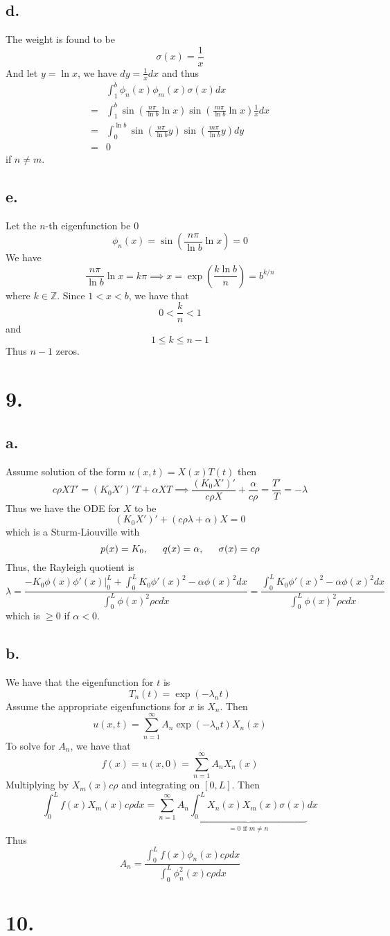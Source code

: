 \documentclass[11pt]{article}
\theoremstyle{mystyle}
\theoremstyle{definition}
\begin{document}
\subsection*{d.}
The weight is found to be 
\[
  \sigma(x) = \displaystyle\frac{1}{x}
\]
And let $y = \ln x$, we have $dy = \displaystyle\frac{1}{x} dx$ and thus  
\begin{align*}
  &\int_1^b \phi_n(x) \phi_m(x) \sigma(x) dx \\
  =& \int_1^b \sin\left(\displaystyle\frac{n\pi}{\ln b} \ln x\right) \sin\left(\displaystyle\frac{m\pi}{\ln b} \ln x\right) \displaystyle\frac{1}{x} dx \\
  =& \int_0^{\ln b} \sin\left(\displaystyle\frac{n\pi}{\ln b} y\right) \sin\left(\displaystyle\frac{m\pi}{\ln b} y\right) dy \\
  =& 0 
\end{align*}
if $n \ne m$. 
\subsection*{e.}
Let the $n$-th eigenfunction be 0
\[
  \phi_n(x) = \sin \left(\displaystyle\frac{n\pi}{\ln b} \ln x\right) = 0
\]
We have 
\[
  \displaystyle\frac{n \pi}{\ln b} \ln x = k \pi \implies x = \exp\left(\displaystyle\frac{k\ln b}{n}\right) = b^{k/n}
\]
where $k \in \mathbb{Z}$. Since $1<x<b$, we have that 
\[
  0< \displaystyle\frac{k}{n} < 1
\]
and 
\[
  1 \le k \le n-1
\]
Thus $n-1$ zeros.
\newpage
\section*{9.}
\subsection*{a.}
Assume solution of the form $u(x,t) = X(x) T(t)$ then 
\[
  c \rho X T' = (K_0 X')' T + \alpha X T \implies \displaystyle\frac{(K_0 X')'}{c\rho X} + \displaystyle\frac{\alpha}{c \rho} = \displaystyle\frac{T'}{T} = -\lambda
\]
Thus we have the ODE for $X$ to be 
\[
  (K_0X')' + (c\rho \lambda + \alpha)X=0 
\]
which is a Sturm-Liouville with 
\[
  p(x) = K_0, \indent q(x) = \alpha, \indent \sigma(x) = c\rho
\]
Thus, the Rayleigh quotient is 
\[
  \lambda = \displaystyle\frac{-K_0 \phi(x) \phi'(x) |^L_0 + \int_0^L K_0 \phi'(x)^2 - \alpha \phi(x)^2 dx}{\int_0^L \phi(x)^2 \rho c dx} = \displaystyle\frac{\int_0^L K_0 \phi'(x)^2 - \alpha \phi(x)^2 dx}{\int_0^L \phi(x)^2 \rho c dx}  
\]
which is $\ge 0$ if $\alpha < 0$. 
\subsection*{b.}
We have that the eigenfunction for $t$ is 
\[
  T_n(t) = \exp(-\lambda_n t)
\]
Assume the appropriate eigenfunctions for $x$ is $X_n$. Then 
\[
  u(x,t) = \sum_{n=1}^\infty A_n  \exp(-\lambda_n t) X_n(x)
\]
To solve for $A_n$, we have that 
\[
  f(x) = u(x,0) = \sum_{n=1}^\infty A_n X_n(x)
\]
Multiplying by $X_m(x) c \rho$ and integrating on $[0,L]$. Then 
\[
  \int_0^L f(x) X_m(x) c \rho dx = \sum_{n=1}^\infty A_n \underbrace{\int_0^L X_n(x) X_m(x) \sigma(x)}_{ = 0 \text{ if } m \ne n} dx 
\]
Thus 
\[
  A_n = \displaystyle\frac{\int_0^L f(x) \phi_n(x) c\rho dx}{\int_0^L \phi^2_n(x) c \rho dx}
\]
\newpage
\section*{10.}
\end{document}
